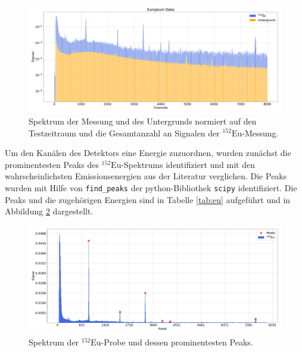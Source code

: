 \begin{figure}[H]
  \centering
  \includegraphics[width=\textwidth]{../plots/Europium.pdf}
  \caption{Spektrum der Messung und des Untergrunds normiert auf den Testzeitraum und die Gesamtanzahl an Signalen der $^{152}\text{Eu}$-Messung.}
  \label{fig:untergrund}
\end{figure}

Um den Kanälen des Detektors eine Energie zuzuordnen, wurden zunächst die prominentesten Peaks des $^{152}\text{Eu}$-Spektrums identifiziert 
und mit den wahrscheinlichsten Emissionsenergien aus der Literatur verglichen.
Die Peaks wurden mit Hilfe von \texttt{find\_peaks} der python-Bibliothek \texttt{scipy} \cite{scipy} 
identifiziert.
Die Peaks und die zugehörigen Energien sind in Tabelle \ref{tab:eu} aufgeführt und in Abbildung \ref{fig:eu} dargestellt.

\begin{figure}[H]
  \centering
  \includegraphics[width=\textwidth]{../plots/Europium-Peaks.pdf}
  \caption{Spektrum der $^{152}\text{Eu}$-Probe und dessen prominentesten Peaks.}
  \label{fig:eu}
\end{figure}


